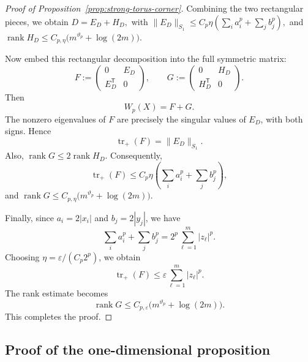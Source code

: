 \documentclass[11pt]{article}
\theoremstyle{definition}
\begin{document}
\begin{proof}[Proof of Proposition~\ref{prop:strong-torus-corner}]
Combining the two rectangular pieces, we obtain
\(
D=E_D+H_D,
\)
with
\(
\|E_D\|_{S_1}
\le
C_p\eta\left(\sum_i a_i^p+\sum_j b_j^p\right),
\)
and
\(
\operatorname{rank}H_D
\le
C_{p,\eta}\bigl(m^{\vartheta_p}+\log(2m)\bigr).
\)

Now embed this rectangular decomposition into the full symmetric matrix:
\[
F:=
\begin{pmatrix}
0&E_D\\
E_D^{\mathsf T}&0
\end{pmatrix},
\qquad
G:=
\begin{pmatrix}
0&H_D\\
H_D^{\mathsf T}&0
\end{pmatrix}.
\]
Then
\[
W_p(X)=F+G.
\]
The nonzero eigenvalues of \(F\) are precisely the singular values of \(E_D\),
with both signs. Hence
\[
\operatorname{tr}_+(F)=\|E_D\|_{S_1}.
\]
Also,
\(
\operatorname{rank}G\le2\operatorname{rank}H_D.
\)
Consequently,
\[
\operatorname{tr}_+(F)
\le
C_p\eta\left(\sum_i a_i^p+\sum_j b_j^p\right),
\]
and
\(
\operatorname{rank}G
\le
C_{p,\eta}\bigl(m^{\vartheta_p}+\log(2m)\bigr).
\)

Finally, since \(a_i=2|x_i|\) and \(b_j=2|y_j|\), we have
\[
\sum_i a_i^p+\sum_j b_j^p
=
2^p\sum_{\ell=1}^m |z_\ell|^p.
\]
Choosing \(\eta=\varepsilon/(C_p2^p)\), we obtain
\[
\operatorname{tr}_+(F)
\le
\varepsilon\sum_{\ell=1}^m |z_\ell|^p.
\]
The rank estimate becomes
\[
\operatorname{rank}G
\le
C_{p,\varepsilon}\bigl(m^{\vartheta_p}+\log(2m)\bigr).
\]
This completes the proof.
\end{proof}

\subsection{Proof of the one-dimensional proposition}
\end{document}
